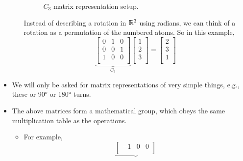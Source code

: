 \documentclass[../notes.tex]{subfiles}
\begin{document}
\begin{itemize}
\begin{itemize}
\begin{figure}[H]
            \caption{$C_3$ matrix representation setup.}
            \label{fig:C3MatrixSetup}
        \end{figure}
        Instead of describing a rotation in $\mathbb{R}^3$ using radians, we can think of a rotation as a permutation of the numbered atoms. So in this example,
        \begin{equation*}
            \underbrace{
                \begin{bmatrix}
                    0 & 1 & 0\\
                    0 & 0 & 1\\
                    1 & 0 & 0\\
                \end{bmatrix}
            }_{C_3}
            \begin{bmatrix}
                1\\
                2\\
                3\\
            \end{bmatrix}
            =
            \begin{bmatrix}
                2\\
                3\\
                1\\
            \end{bmatrix}
        \end{equation*}
    \end{itemize}
    \item We will only be asked for matrix representations of very simple things, e.g., these or \ang{90} or \ang{180} turns.
    \item The above matrices form a mathematical group, which obeys the same multiplication table as the operations.
    \begin{itemize}
        \item For example,
        \begin{equation*}
            \underbrace{
                \begin{bmatrix}
                    -1 & 0 & 0\\

\end{bmatrix}}
\end{equation*}
\end{itemize}
\end{itemize}
\end{document}
